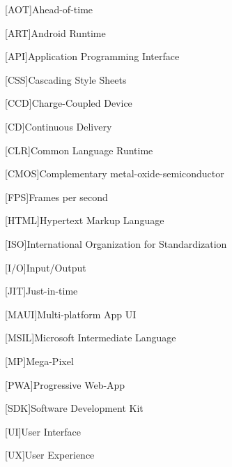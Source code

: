 \begin{acronym}[AAAAA]

[AOT]{Ahead-of-time}

[ART]{Android Runtime}

[API]{Application Programming Interface}

[CSS]{Cascading Style Sheets}

[CCD]{Charge-Coupled Device}

[CD]{Continuous Delivery}

[CLR]{Common Language Runtime}

[CMOS]{Complementary metal-oxide-semiconductor}

[FPS]{Frames per second}

[HTML]{Hypertext Markup Language}

[ISO]{International Organization for Standardization}

[I/O]{Input/Output}

[JIT]{Just-in-time}

[MAUI]{Multi-platform App UI}

[MSIL]{Microsoft Intermediate Language}

[MP]{Mega-Pixel}

[PWA]{Progressive Web-App}

[SDK]{Software Development Kit}

[UI]{User Interface}

[UX]{User Experience}

\end{acronym}